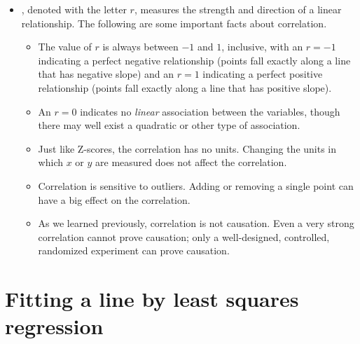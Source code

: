 \begin{itemize}
\item {}, denoted with the letter $r$, measures the strength and direction of a linear relationship.  The following are some important facts about correlation.
\begin{itemize}
\item The value of $r$ is always between $-1$ and $1$, inclusive, with an $r=-1$ indicating a perfect negative relationship (points fall exactly along a line that has negative slope) and an $r=1$ indicating a perfect positive relationship (points fall exactly along a line that has positive slope).  
\item An $r=0$ indicates no \emph{linear} association between the variables, though there may well exist a quadratic or other type of association.
\item Just like Z-scores, the correlation has no units.  Changing the units in which $x$ or $y$ are measured does not affect the correlation.
\item Correlation is sensitive to outliers.  Adding or removing a single point can have a big effect on the correlation.
\item As we learned previously, correlation is not causation.  Even a very strong correlation cannot prove causation; only a well-designed, controlled, randomized experiment can prove causation.  \end{itemize}


\end{itemize}




{}


\section[Fitting a line by least squares regression]{Fitting a line by least squares regression }
\label{fittingALineByLSR}

